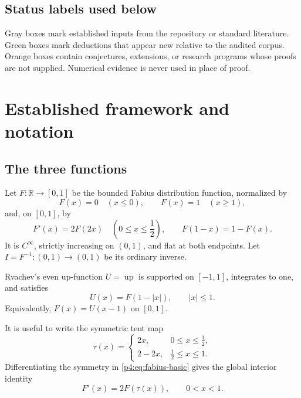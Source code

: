 \documentclass[11pt]{article}
\numberwithin{equation}{section}
\theoremstyle{definition}
\theoremstyle{remark}
\newcommand{\R}{\mathbb R}
\newcommand{\Up}{\operatorname{up}}
\begin{document}
\subsection{Status labels used below}
Gray boxes mark established inputs from the repository or standard literature.  Green boxes mark deductions that appear new relative to the audited corpus.  Orange boxes contain conjectures, extensions, or research programs whose proofs are not supplied.  Numerical evidence is never used in place of proof.

\section{Established framework and notation}
\label{p4:sec:framework}

\subsection{The three functions}
Let $F:\R\to[0,1]$ be the bounded Fabius distribution function, normalized by
\[
 F(x)=0\quad(x\le0),\qquad F(x)=1\quad(x\ge1),
\]
and, on $[0,1]$, by
\begin{equation}
 F'(x)=2F(2x)\quad\left(0\le x\le\frac12\right),
 \qquad F(1-x)=1-F(x).
 \label{p4:eq:fabius-basic}
\end{equation}
It is $C^\infty$, strictly increasing on $(0,1)$, and flat at both endpoints.  Let $I=F^{-1}:(0,1)\to(0,1)$ be its ordinary inverse.

Rvachev's even up-function $U=\Up$ is supported on $[-1,1]$, integrates to one, and satisfies~\cite{p4:ariasUp,p4:ariasArithmetic}
\begin{equation}
 U(x)=F(1-|x|),\qquad |x|\le1.
 \label{p4:eq:up-fabius}
\end{equation}
Equivalently, $F(x)=U(x-1)$ on $[0,1]$.

It is useful to write the symmetric tent map
\begin{equation}
 \tau(x)=
 \begin{cases}
  2x,&0\le x\le\frac12,\\
  2-2x,&\frac12\le x\le1.
 \end{cases}
 \label{p4:eq:tent}
\end{equation}
Differentiating the symmetry in \eqref{p4:eq:fabius-basic} gives the global interior identity
\begin{equation}
 F'(x)=2F(\tau(x)),\qquad 0<x<1.
 \label{p4:eq:tent-derivative}
\end{equation}
\end{document}
